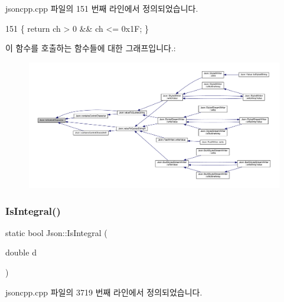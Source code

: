 jsoncpp.\+cpp 파일의 151 번째 라인에서 정의되었습니다.


\begin{DoxyCode}
151 \{ \textcolor{keywordflow}{return} ch > 0 && ch <= 0x1F; \}
\end{DoxyCode}
이 함수를 호출하는 함수들에 대한 그래프입니다.\+:\nopagebreak
\begin{figure}[H]
\begin{center}
\leavevmode
\includegraphics[width=350pt]{namespace_json_a0381e631737f51331065a388f4f59197_icgraph}
\end{center}
\end{figure}
\mbox{\label{namespace_json_a1a04cc9d31e64b5912dade003c9b99b5}} 
\subsubsection{\texorpdfstring{Is\+Integral()}{IsIntegral()}}
{\footnotesize\ttfamily static bool Json\+::\+Is\+Integral (\begin{DoxyParamCaption}\item[{double}]{d }\end{DoxyParamCaption})\hspace{0.3cm}{\ttfamily [static]}}



jsoncpp.\+cpp 파일의 3719 번째 라인에서 정의되었습니다.


